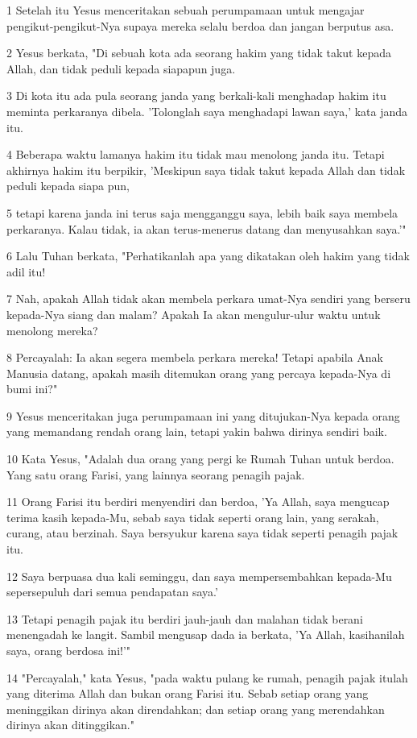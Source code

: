 \par 1 Setelah itu Yesus menceritakan sebuah perumpamaan untuk mengajar pengikut-pengikut-Nya supaya mereka selalu berdoa dan jangan berputus asa.
\par 2 Yesus berkata, "Di sebuah kota ada seorang hakim yang tidak takut kepada Allah, dan tidak peduli kepada siapapun juga.
\par 3 Di kota itu ada pula seorang janda yang berkali-kali menghadap hakim itu meminta perkaranya dibela. 'Tolonglah saya menghadapi lawan saya,' kata janda itu.
\par 4 Beberapa waktu lamanya hakim itu tidak mau menolong janda itu. Tetapi akhirnya hakim itu berpikir, 'Meskipun saya tidak takut kepada Allah dan tidak peduli kepada siapa pun,
\par 5 tetapi karena janda ini terus saja mengganggu saya, lebih baik saya membela perkaranya. Kalau tidak, ia akan terus-menerus datang dan menyusahkan saya.'"
\par 6 Lalu Tuhan berkata, "Perhatikanlah apa yang dikatakan oleh hakim yang tidak adil itu!
\par 7 Nah, apakah Allah tidak akan membela perkara umat-Nya sendiri yang berseru kepada-Nya siang dan malam? Apakah Ia akan mengulur-ulur waktu untuk menolong mereka?
\par 8 Percayalah: Ia akan segera membela perkara mereka! Tetapi apabila Anak Manusia datang, apakah masih ditemukan orang yang percaya kepada-Nya di bumi ini?"
\par 9 Yesus menceritakan juga perumpamaan ini yang ditujukan-Nya kepada orang yang memandang rendah orang lain, tetapi yakin bahwa dirinya sendiri baik.
\par 10 Kata Yesus, "Adalah dua orang yang pergi ke Rumah Tuhan untuk berdoa. Yang satu orang Farisi, yang lainnya seorang penagih pajak.
\par 11 Orang Farisi itu berdiri menyendiri dan berdoa, 'Ya Allah, saya mengucap terima kasih kepada-Mu, sebab saya tidak seperti orang lain, yang serakah, curang, atau berzinah. Saya bersyukur karena saya tidak seperti penagih pajak itu.
\par 12 Saya berpuasa dua kali seminggu, dan saya mempersembahkan kepada-Mu sepersepuluh dari semua pendapatan saya.'
\par 13 Tetapi penagih pajak itu berdiri jauh-jauh dan malahan tidak berani menengadah ke langit. Sambil mengusap dada ia berkata, 'Ya Allah, kasihanilah saya, orang berdosa ini!'"
\par 14 "Percayalah," kata Yesus, "pada waktu pulang ke rumah, penagih pajak itulah yang diterima Allah dan bukan orang Farisi itu. Sebab setiap orang yang meninggikan dirinya akan direndahkan; dan setiap orang yang merendahkan dirinya akan ditinggikan."
